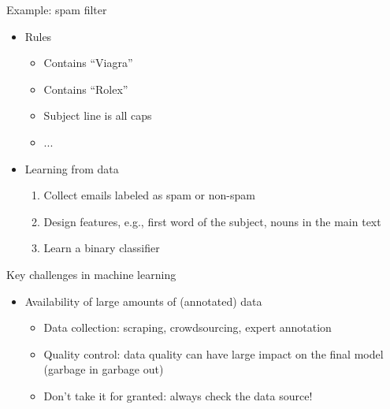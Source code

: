 \documentclass[usenames,dvipsnames,notes,11pt,aspectratio=169]{beamer}
\begin{document}
\begin{frame}
    {Example: spam filter}
    
    \begin{itemize}
        \itemsep1em
        \item Rules
            \begin{itemize}
                \item[] Contains ``Viagra''
                \item[] Contains ``Rolex''
                \item[] Subject line is all caps
                \item[] ... 
            \end{itemize}
        \item Learning from data
            \begin{enumerate}
                \item Collect emails labeled as spam or non-spam 
                \item Design features, e.g., first word of the subject, nouns in the main text
                \item Learn a binary classifier 
            \end{enumerate}
    \end{itemize}
    \medskip
\end{frame}

\begin{frame}
    {Key challenges in machine learning}
    \begin{itemize}
        \itemsep1em
        \item Availability of large amounts of (annotated) data
            \begin{itemize}
                \item Data collection: scraping, crowdsourcing, expert annotation
                \item Quality control: data quality can have large impact on the final model (garbage in garbage out)
                \item Don't take it for granted: always check the data source!
            \end{itemize}
    \end{itemize}
\end{frame}
\end{document}
